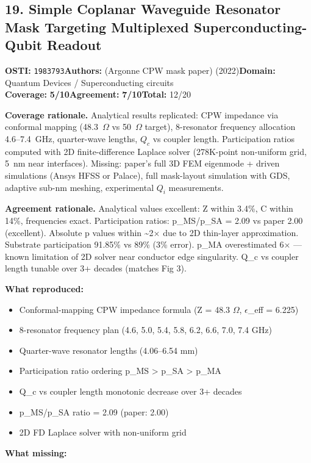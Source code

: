 \documentclass[11pt]{article}
\newcommand{\scorebadge}[2]{\textbf{#1:} \textbf{#2/10}}
\begin{document}
\subsection{19. Simple Coplanar Waveguide Resonator Mask Targeting Multiplexed Superconducting-Qubit Readout}
\textbf{OSTI:} \texttt{1983793}\quad\textbf{Authors:} (Argonne CPW mask paper) (2022)\quad\textbf{Domain:} Quantum Devices / Superconducting circuits\\
\scorebadge{Coverage}{5}\quad\scorebadge{Agreement}{7}\quad\textbf{Total:} 12/20\par\smallskip
\noindent\textbf{Coverage rationale.} Analytical results replicated: CPW impedance via conformal mapping (48.3~$\Omega$ vs 50~$\Omega$ target), 8-resonator frequency allocation 4.6--7.4~GHz, quarter-wave lengths, $Q_c$ vs coupler length. Participation ratios computed with 2D finite-difference Laplace solver (278K-point non-uniform grid, 5~nm near interfaces). Missing: paper's full 3D FEM eigenmode + driven simulations (Ansys HFSS or Palace), full mask-layout simulation with GDS, adaptive sub-nm meshing, experimental $Q_i$ measurements.\par
\noindent\textbf{Agreement rationale.} Analytical values excellent: Z within 3.4\%, C within 14\%, frequencies exact. Participation ratios: p\_MS/p\_SA = 2.09 vs paper 2.00 (excellent). Absolute p values within \textasciitilde{}2$\times$ due to 2D thin-layer approximation. Substrate participation 91.85\% vs 89\% (3\% error). p\_MA overestimated 6$\times$ --- known limitation of 2D solver near conductor edge singularity. Q\_c vs coupler length tunable over 3+ decades (matches Fig 3).\par\smallskip
\noindent\textbf{What reproduced:}
\begin{itemize}[leftmargin=1.4em,itemsep=0.2em,topsep=0.2em]
\item Conformal-mapping CPW impedance formula (Z = 48.3 $\Omega$, $\epsilon$\_eff = 6.225)
\item 8-resonator frequency plan (4.6, 5.0, 5.4, 5.8, 6.2, 6.6, 7.0, 7.4 GHz)
\item Quarter-wave resonator lengths (4.06--6.54 mm)
\item Participation ratio ordering p\_MS \textgreater{} p\_SA \textgreater{} p\_MA
\item Q\_c vs coupler length monotonic decrease over 3+ decades
\item p\_MS/p\_SA ratio = 2.09 (paper: 2.00)
\item 2D FD Laplace solver with non-uniform grid
\end{itemize}\noindent\textbf{What missing:}
\end{document}
